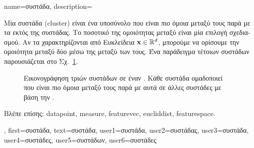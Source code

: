 {name={\foreignlanguage{greek}{συστάδα}}, 
	description={\foreignlanguage{greek}{Μία συστάδα} (cluster) \foreignlanguage{greek}{είναι ένα υποσύνολο}
		 \foreignlanguage{greek}{που είναι πιο όμοια μεταξύ τους παρά με τα}  
		\foreignlanguage{greek}{εκτός της συστάδας. Το ποσοτικό}  \foreignlanguage{greek}{της ομοιότητας μεταξύ} 
		 \foreignlanguage{greek}{είναι μία επιλογή σχεδιασμού. Αν τα}  
		\foreignlanguage{greek}{χαρακτηρίζονται από Ευκλείδεια}  ${\bf x} \in \mathbb{R}^{d}$, 
		\foreignlanguage{greek}{μπορούμε να ορίσουμε την ομοιότητα μεταξύ δύο}  \foreignlanguage{greek}{μέσω της} 
		 \foreignlanguage{greek}{μεταξύ των}  \foreignlanguage{greek}{τους. Ένα παράδειγμα 
		τέτοιων συστάδων παρουσιάζεται στο Σχ.}\ \ref{fig:clusters_dict}.
		\begin{figure}[H]
		\centering
		{
		\caption{\foreignlanguage{greek}{Εικονογράφηση τριών συστάδων σε έναν}  . 
			\foreignlanguage{greek}{Κάθε συστάδα ομαδοποιεί}  \foreignlanguage{greek}{που είναι πιο όμοια μεταξύ τους 
			παρά με αυτά σε άλλες συστάδες με βάση την} . }
			\label{fig:clusters_dict} }
		\end{figure}
		\foreignlanguage{greek}{Βλέπε επίσης:} \gls{datapoint}, \gls{measure}, \gls{featurevec}, \gls{eucliddist}, \gls{featurespace}.},
	first={\foreignlanguage{greek}{συστάδα}},
	text={\foreignlanguage{greek}{συστάδα}},
	user1={\foreignlanguage{greek}{συστάδα}}, %
	user2={\foreignlanguage{greek}{συστάδας}}, %
	user3={\foreignlanguage{greek}{συστάδα}}, %
	user4={\foreignlanguage{greek}{συστάδες}}, %
	user5={\foreignlanguage{greek}{συστάδων}}, %
	user6={\foreignlanguage{greek}{συστάδες}} %
}

